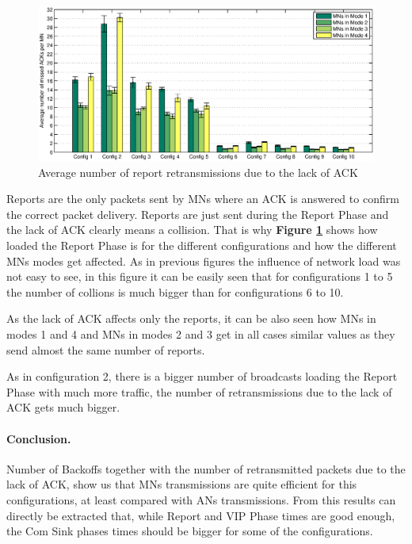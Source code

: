 \begin{figure}[ht]
 \begin{center}
  \includegraphics[width=1\textwidth]{nbMissedACKMN.eps}
 \end{center}
 \caption{Average number of report retransmissions due to the lack of ACK}
 \label{fig:nbMissedACKMN}
\end{figure}

Reports are the only packets sent by \acp{MN} where an \ac{ACK} is answered to confirm the correct packet delivery. Reports are just sent during the
Report Phase and the lack of \ac{ACK} clearly means a collision. That is why \textbf{Figure \ref{fig:nbMissedACKMN}} shows how loaded the Report Phase is
for the different configurations and how the different \acp{MN} modes get affected. As in previous figures the influence of network load was not easy to
see, in this figure it can be easily seen that for configurations 1 to 5 the number of collions is much bigger than for configurations 6 to 10.

As the lack of \ac{ACK} affects only the reports, it can be also seen how \acp{MN} in modes 1 and 4 and \acp{MN} in modes 2 and 3 get in all cases similar
values as they send almost the same number of reports.

As in configuration 2, there is a bigger number of broadcasts loading the Report Phase with much more traffic, the number of retransmissions due to 
the lack of \ac{ACK} gets much bigger.

\paragraph{Conclusion.} Number of Backoffs together with the number of retransmitted packets due to the lack of ACK, show us that \acp{MN} transmissions 
are quite efficient for this configurations, at least compared with \acp{AN} transmissions. From this results can directly be extracted that, while 
Report and VIP Phase times are good enough, the Com Sink phases times should be bigger for some of the configurations.

